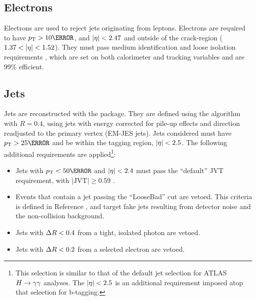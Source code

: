 \subsection{Electrons}

Electrons are used to reject jets originating from leptons. Electrons are required to have $\pt > \unit{10}{\GeV}$, and $|\eta| < 2.47$ and outside of the crack-region ($1.37 < |\eta| < 1.52$). They must pass medium identification and loose isolation requirements \cite{electron-efficiency}, which are set on both calorimeter and tracking variables and are 99\% efficient.

\subsection{Jets}

Jets are reconstructed with the  \cite{fastjet} package. They are defined using the \antikt algorithm with $R=0.4$, using jets with energy corrected for pile-up effects and direction readjusted to the primary vertex (EM-JES jets). Jets considered must have $\pt > \unit{25}{\GeV}$ and be within the tagging region, $|\eta| < 2.5$. The following additional requirements are applied\footnote{This selection is similar to that of the default jet selection for ATLAS $H\rightarrow \gamma\gamma$ analyses. The $|\eta| < 2.5$ is an additional requirement imposed atop that selection for b-tagging.}:

\begin{itemize}
  \item Jets with $\pt < \unit{50}{\GeV}$ and $|\eta| < 2.4$ must pass the ``default'' \gls{JVT} requirement, with $|\text{JVT}| \geq 0.59$ \cite{JVT}.
  \item Events that contain a jet passing the ``LooseBad'' cut are vetoed. This criteria is defined in Reference \cite{loosebad}, and target fake jets resulting from detector noise and the non-collision background. 
  \item Jets with $\Delta R < 0.4$ from a tight, isolated photon are vetoed.
  \item Jets with $\Delta R < 0.2$ from a selected electron are vetoed.
\end{itemize}


